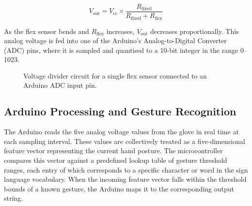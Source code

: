 \[
V_{\text{out}} = V_{\text{cc}} \times \frac{R_{\text{fixed}}}{R_{\text{fixed}} + R_{\text{flex}}}
\]

As the flex sensor bends and \(R_{\text{flex}}\) increases, \(V_{\text{out}}\) decreases proportionally. This analog voltage is fed into one of the Arduino's Analog-to-Digital Converter (ADC) pins, where it is sampled and quantised to a 10-bit integer in the range 0–1023.

\begin{figure}[h]
	\centering
	\caption{Voltage divider circuit for a single flex sensor connected to an Arduino ADC input pin.}
	\label{fig:voltage_divider}
\end{figure}

\subsection{Arduino Processing and Gesture Recognition}

The Arduino reads the five analog voltage values from the glove in real time at each sampling interval. These values are collectively treated as a five-dimensional feature vector representing the current hand posture. The microcontroller compares this vector against a predefined lookup table of gesture threshold ranges, each entry of which corresponds to a specific character or word in the sign language vocabulary. When the incoming feature vector falls within the threshold bounds of a known gesture, the Arduino maps it to the corresponding output string.

